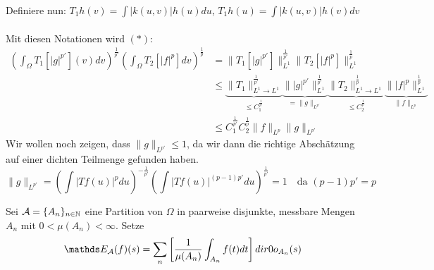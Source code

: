 \begin{beweis}
\begin{itemize}
			Definiere nun: $T_{1} h(v) = \int |k(u, v)| h(u) du$, $T_{1} h(u) = \int |k(u, v)| h(v) dv $ \\ \\
			Mit diesen Notationen wird $(*)$:
			\begin{align*}
				\left( \int_{\Omega} T_{1}[|g|^{p'}](v) dv \right)^{\frac{1}{p'}} \left( \int_{\Omega} T_{2} [|f|^{p}] dv \right)^{\frac{1}{p}} & = \| T_{1}[|g|^{p'}] \|_{L^{1}}^{\frac{1}{p'}} \| T_{2}[|f|^{p}] \|_{L^{1}}^{\frac{1}{p}} \\
				& \leq \underbrace{\| T_{1} \|_{L^{1} \rightarrow L^{1}}^{\frac{1}{p'}}}_{\leq C_{1}^{\frac{1}{p'}}} \underbrace{\||g|^{p'}\|_{L^{1}}^{\frac{1}{p'}}}_{= \|g\|_{L^{p'}}} \underbrace{\| T_{2} \|_{L^{1} \rightarrow L^{1}}^{\frac{1}{p}}}_{\leq C_{2}^{\frac{1}{p}}} \underbrace{\||f|^{p}\|_{L^{1}}^{\frac{1}{p}}}_{\| f \|_{L^{p}}} \\
            & \leq C_{1}^{\frac{1}{p'}} C_{2}^{\frac{1}{p}} \| f \|_{L^{p}} \| g \|_{L^{p'}}
            \end{align*}
            Wir wollen noch zeigen, dass $\| g \|_{L^{p'}} \leq 1$, da wir dann die richtige Abschätzung auf einer dichten Teilmenge gefunden haben.
            \[ \| g \|_{L^{p'}} = \left( \int | T f(u) |^{p} du \right)^{- \frac{1}{p'}} \left( \int |T f(u)|^{(p-1)p'} du \right)^{\frac{1}{p'}} = 1 \quad \text{da } (p - 1) p' = p \]
    \end{itemize}	
\end{beweis}


\begin{definition} 
	Sei $\mathcal{A} = \{ A_{n} \}_{n \in \mathbb{N}}$ eine Partition von $\Omega$ in paarweise disjunkte, messbare Mengen $A_{n}$ mit $0 < \mu(A_{n}) < \infty$. Setze
	\[ \EW_{\ca}(f)(s) = \sum_{n} \left[ \frac{1}{\mu(A_{n})} \int_{A_{n}} f(t) dt \right] \1_{A_{n}}(s) \] 
\end{definition}


